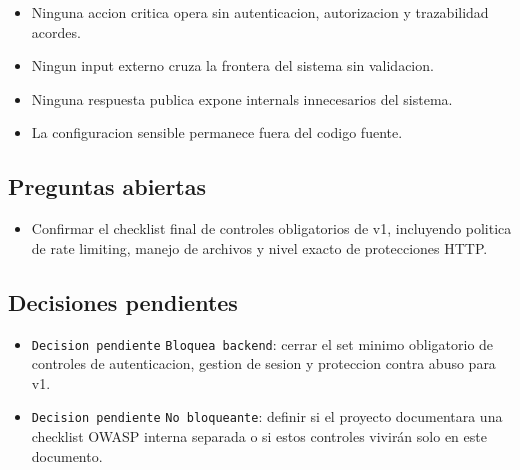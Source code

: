 \begin{itemize}
  \item Ninguna accion critica opera sin autenticacion, autorizacion y trazabilidad acordes.
  \item Ningun input externo cruza la frontera del sistema sin validacion.
  \item Ninguna respuesta publica expone internals innecesarios del sistema.
  \item La configuracion sensible permanece fuera del codigo fuente.
\end{itemize}

\subsection{Preguntas abiertas}

\begin{itemize}
  \item Confirmar el checklist final de controles obligatorios de v1, incluyendo politica de rate limiting, manejo de archivos y nivel exacto de protecciones HTTP.
\end{itemize}

\subsection{Decisiones pendientes}

\begin{itemize}
  \item \texttt{Decision pendiente} \texttt{Bloquea backend}: cerrar el set minimo obligatorio de controles de autenticacion, gestion de sesion y proteccion contra abuso para v1.
  \item \texttt{Decision pendiente} \texttt{No bloqueante}: definir si el proyecto documentara una checklist OWASP interna separada o si estos controles vivirán solo en este documento.
\end{itemize}
